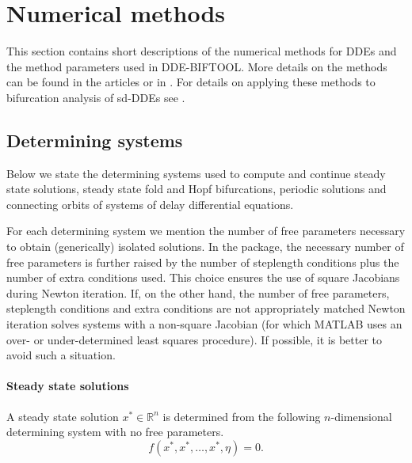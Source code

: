 \documentclass[10pt]{scrartcl}
\newcommand{\DDEBIFCODE}{\textsc{DDE-BIFTOOL}}
\newcommand{\RR}{\mathbb{R}}
\begin{document}
{\section{Numerical methods}\label{numerical_methods}\label{code_num_methods}
This section contains short descriptions of the numerical methods 
for DDEs and the method parameters used in {\DDEBIFCODE}. 
More details on the methods can be found in the
articles \cite{Luzy96,Enge99a,Enge99b,en_d01,engel01,homoclinic} 
or in \cite{Enge00}. For details on applying these methods to bifurcation
analysis of sd-DDEs see \cite{luz01}.

\subsection{Determining systems}\label{determining_systems}

Below we state the determining systems used to compute and
continue steady state solutions, steady state fold and Hopf 
bifurcations, periodic solutions and connecting orbits of systems of delay
differential equations.

For each determining system we mention the number of free 
parameters necessary to obtain (generically) isolated 
solutions. 
In the package,
the necessary number of free parameters
is further raised by the number of
steplength conditions plus the number of extra conditions used.
This choice ensures 
the use of square Jacobians during Newton iteration. 
If, on the other hand, the number of free parameters, 
steplength conditions and extra conditions
are not appropriately matched Newton iteration solves systems with a   
non-square Jacobian (for which MATLAB uses an
over- or under-determined
least squares procedure). 
If possible, it is better to avoid such a situation.

\paragraph{Steady state solutions}
A steady state solution $x^*\in\RR^n$ is determined from the following
$n$-dimensional determining system with no free parameters.
\begin{equation}\label{determ_stst}
f(x^*,x^*,\ldots,x^*,\eta)=0.
\end{equation}

}
\end{document}
